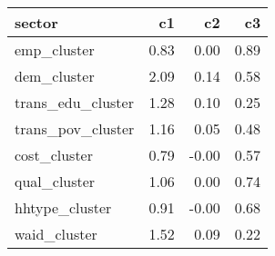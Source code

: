 \begin{table}[ht]
    \centering
    \begin{tabular}{lrrr}
      \hline
    sector & c1 & c2 & c3 \\ 
      \hline
    emp\_cluster & 0.83 & 0.00 & 0.89 \\ 
      dem\_cluster & 2.09 & 0.14 & 0.58 \\ 
      trans\_edu\_cluster & 1.28 & 0.10 & 0.25 \\ 
      trans\_pov\_cluster & 1.16 & 0.05 & 0.48 \\ 
      cost\_cluster & 0.79 & -0.00 & 0.57 \\ 
      qual\_cluster & 1.06 & 0.00 & 0.74 \\ 
      hhtype\_cluster & 0.91 & -0.00 & 0.68 \\ 
      waid\_cluster & 1.52 & 0.09 & 0.22 \\ 
       \hline
    \end{tabular}
    \end{table}